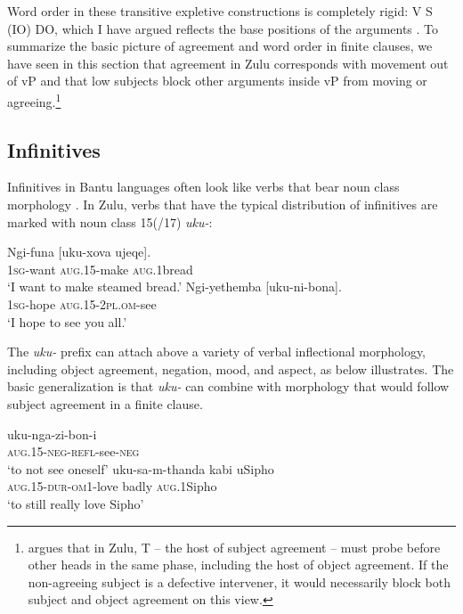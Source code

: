 \documentclass[output=paper,colorlinks,citecolor=brown]{langscibook}
\begin{document}
Word order in these transitive expletive constructions is completely rigid: V S (IO) DO, which I have argued reflects the base positions of the arguments \citep{Halpert2015}. To summarize the basic picture of agreement and word order in finite clauses, we have seen in this section that agreement in Zulu corresponds with movement out of vP and that low subjects block other arguments inside vP from moving or agreeing.\footnote{\citet{Zeller2015} argues that in Zulu, T – the host of subject agreement – must probe before other heads in the same phase, including the host of object agreement.  If the non-agreeing subject is a defective intervener, it would necessarily block both subject and object agreement on this view.} 
 
\subsection{Infinitives}\label{sec:halpert:2.2}
 
Infinitives in Bantu languages often look like verbs that bear noun class morphology \citep{Schadeberg2003}. In Zulu, verbs that have the typical distribution of infinitives are marked with noun class 15(/17) \textit{uku-}:

\ea%
    \label{ex:halpert:7}
    \ea%
    \label{ex:halpert:7a}
    \gll    Ngi-funa [uku-xova ujeqe].\\
            1\textsc{sg}-want  \textsc{aug}.15-make \textsc{aug}.1bread\\
    \glt    `I want to make steamed bread.'
    \ex%
    \gll    Ngi-yethemba [uku-ni-bona].\\
            1\textsc{sg}-hope  \textsc{aug}.15-2\textsc{pl}.\textsc{om}-see\\
    \glt    `I hope to see you all.'
    \z 
\z 

The \textit{uku-} prefix can attach above a variety of verbal inflectional morphology, including object agreement, negation, mood, and aspect, as  below illustrates.  The basic generalization is that \textit{uku-} can combine with morphology that would follow subject agreement in a finite clause.

\ea%
    \label{ex:halpert:8}
    \ea%
    \label{ex:halpert:8a}
    \gll    uku-nga-zi-bon-i\\
            \textsc{aug}.15-\textsc{neg}-\textsc{refl}-see-\textsc{neg}\\
    \glt    `to not see oneself'
    \ex%
    \label{ex:halpert:8b}
    \gll    uku-sa-m-thanda kabi uSipho\\
            \textsc{aug}.15-\textsc{dur}-\textsc{om}1-love badly \textsc{aug}.1Sipho\\
    \glt    `to still really love Sipho'
    \z 
\z 
\end{document}
